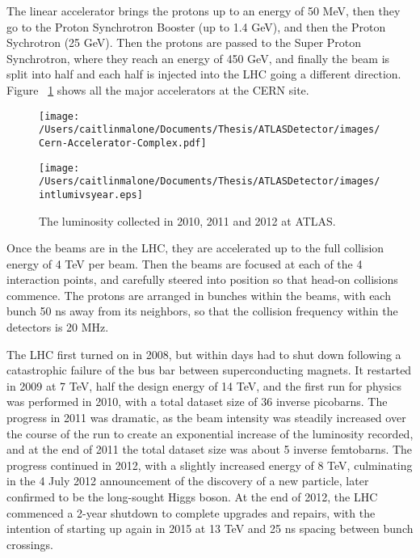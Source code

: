 The linear accelerator brings the protons up to an energy of 50 MeV, then they go to the Proton Synchrotron Booster (up to 1.4 GeV), and then the Proton Sychrotron (25 GeV).  Then the protons are passed to the Super Proton Synchrotron, where they reach an energy of 450 GeV, and finally the beam is split into half and each half is injected into the LHC going a different direction.  Figure ~\ref{fig:accelerator_complex} shows all the major accelerators at the CERN site.

\begin{figure}
	\texttt{[image: /Users/caitlinmalone/Documents/Thesis/ATLASDetector/images/Cern-Accelerator-Complex.pdf]}
	\label{fig:accelerator_complex}
\end{figure}

\begin{figure}
	\texttt{[image: /Users/caitlinmalone/Documents/Thesis/ATLASDetector/images/intlumivsyear.eps]}
	\label{fig:lumi_vs_year}
	\caption{The luminosity collected in 2010, 2011 and 2012 at ATLAS. }
\end{figure}


Once the beams are in the LHC, they are accelerated up to the full collision energy of 4 TeV per beam.  Then the beams are focused at each of the 4 interaction points, and carefully steered into position so that head-on collisions commence.  The protons are arranged in bunches within the beams, with each bunch 50 ns away from its neighbors, so that the collision frequency within the detectors is 20 MHz.  

The LHC first turned on in 2008, but within days had to shut down following a catastrophic failure of the bus bar between superconducting magnets.  It restarted in 2009 at 7 TeV, half the design energy of 14 TeV, and the first run for physics was performed in 2010, with a total dataset size of 36 inverse picobarns.  The progress in 2011 was dramatic, as the beam intensity was steadily increased over the course of the run to create an exponential increase of the luminosity recorded, and at the end of 2011 the total dataset size was about 5 inverse femtobarns.  The progress continued in 2012, with a slightly increased energy of 8 TeV, culminating in the 4 July 2012 announcement of the discovery of a new particle, later confirmed to be the long-sought Higgs boson.  At the end of 2012, the LHC commenced a 2-year shutdown to complete upgrades and repairs, with the intention of starting up again in 2015 at 13 TeV and 25 ns spacing between bunch crossings.

